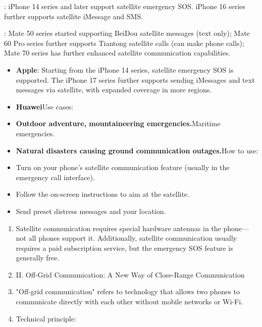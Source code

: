 


: iPhone 14 series and later support satellite emergency SOS. iPhone 16 series further supports satellite iMessage and SMS.


: Mate 50 series started supporting BeiDou satellite messages (text only); Mate 60 Pro series further supports Tiantong satellite calls (can make phone calls); Mate 70 series has further enhanced satellite communication capabilities.


\begin{itemize}
  \item \textbf{Apple}: Starting from the iPhone 14 series, satellite emergency SOS is supported. The iPhone 17 series further supports sending iMessages and text messages via satellite, with expanded coverage in more regions.
  \item \textbf{Huawei}Use cases:
  \item \textbf{Outdoor adventure, mountaineering emergencies.}Maritime emergencies.
  \item \textbf{Natural disasters causing ground communication outages.}How to use:
\end{itemize}


\begin{itemize}
  \item Turn on your phone's satellite communication feature (usually in the emergency call interface).
  \item Follow the on-screen instructions to aim at the satellite.
  \item Send preset distress messages and your location.
\end{itemize}


\begin{enumerate}
  \item Satellite communication requires special hardware antennas in the phone—not all phones support it. Additionally, satellite communication usually requires a paid subscription service, but the emergency SOS feature is generally free.
  \item II. Off-Grid Communication: A New Way of Close-Range Communication
  \item "Off-grid communication" refers to technology that allows two phones to communicate directly with each other without mobile networks or Wi-Fi.
  \item Technical principle:
\end{enumerate}

